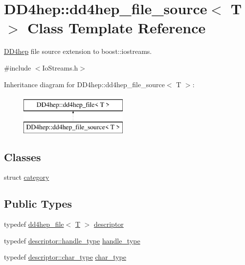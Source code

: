 \hypertarget{class_d_d4hep_1_1dd4hep__file__source}{}\section{D\+D4hep\+:\+:dd4hep\+\_\+file\+\_\+source$<$ T $>$ Class Template Reference}
\label{class_d_d4hep_1_1dd4hep__file__source}


\hyperlink{namespace_d_d4hep}{D\+D4hep} file source extension to boost\+::iostreams.  




{\ttfamily \#include $<$Io\+Streams.\+h$>$}

Inheritance diagram for D\+D4hep\+:\+:dd4hep\+\_\+file\+\_\+source$<$ T $>$\+:\begin{figure}[H]
\begin{center}
\leavevmode
\includegraphics[height=2.000000cm]{class_d_d4hep_1_1dd4hep__file__source}
\end{center}
\end{figure}
\subsection*{Classes}
\begin{DoxyCompactItemize}
\item 
struct \hyperlink{struct_d_d4hep_1_1dd4hep__file__source_1_1category}{category}
\end{DoxyCompactItemize}
\subsection*{Public Types}
\begin{DoxyCompactItemize}
\item 
typedef \hyperlink{class_d_d4hep_1_1dd4hep__file}{dd4hep\+\_\+file}$<$ \hyperlink{class_t}{T} $>$ \hyperlink{class_d_d4hep_1_1dd4hep__file__source_acd7bec0e43b763cf692f18ce75a4dba8}{descriptor}
\item 
typedef \hyperlink{class_d_d4hep_1_1dd4hep__file_a4d79f8d433cd7831ff818691424cd6fc}{descriptor\+::handle\+\_\+type} \hyperlink{class_d_d4hep_1_1dd4hep__file__source_abdabe1da6c2a2b2297dc86f41368c234}{handle\+\_\+type}
\item 
typedef \hyperlink{class_d_d4hep_1_1dd4hep__file_aef4242f7f2fe15a59f7bf7a8f6ba24d5}{descriptor\+::char\+\_\+type} \hyperlink{class_d_d4hep_1_1dd4hep__file__source_ad18eef60f1b38b5958eec9f287dac85a}{char\+\_\+type}
\end{DoxyCompactItemize}
